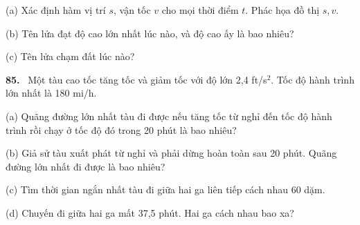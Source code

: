 \documentclass[12pt,a4paper]{article}
\newcommand{\bt}[1]{\par\smallskip\Needspace{5\baselineskip}\noindent\textbf{#1.}\ }
\begin{document}
(a) Xác định hàm vị trí $s$, vận tốc $v$ cho mọi thời điểm $t$. Phác họa đồ thị $s,v$.

(b) Tên lửa đạt độ cao lớn nhất lúc nào, và độ cao ấy là bao nhiêu?

(c) Tên lửa chạm đất lúc nào?
\bt{85} Một tàu cao tốc tăng tốc và giảm tốc với độ lớn 2,4 ft/s$^2$. Tốc độ hành trình lớn nhất là 180 mi/h.

(a) Quãng đường lớn nhất tàu đi được nếu tăng tốc từ nghỉ đến tốc độ hành trình rồi chạy ở tốc độ đó trong 20 phút là bao nhiêu?

(b) Giả sử tàu xuất phát từ nghỉ và phải dừng hoàn toàn sau 20 phút. Quãng đường lớn nhất đi được là bao nhiêu?

(c) Tìm thời gian ngắn nhất tàu đi giữa hai ga liên tiếp cách nhau 60 dặm.

(d) Chuyến đi giữa hai ga mất 37,5 phút. Hai ga cách nhau bao xa?
\end{document}
